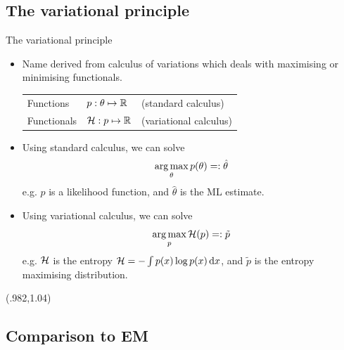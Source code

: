 \subsection{The variational principle}

\begin{frame}[label=variationalprinc]{The variational principle}
  \vspace{-10pt}
  \begin{itemize}[<+->]
    \item Name derived from calculus of variations which deals with maximising or minimising functionals.
    \begin{table}
      \begin{tabular}{l  l  l }
      Functions   &$p:\theta \mapsto \mathbb{R}$  &(standard calculus) \\ 
      Functionals &${\mathcal H}:p \mapsto \mathbb{R}$     &(variational calculus) \\ 
      \end{tabular}
    \end{table}
  \item Using standard calculus, we can solve
  \[
    \operatorname*{arg\,max}_\theta p(\theta) =: \hat\theta
  \]
  e.g. $p$ is a likelihood function, and $\hat\theta$ is the ML estimate.
  \item Using variational calculus, we can solve
  \[
    \operatorname*{arg\,max}_p {\mathcal H}(p) =: \tilde p
  \]
  e.g. ${\mathcal H}$ is the entropy ${\mathcal H} = - \int p(x)\log p(x) \, \text{d} x$, and $\tilde p$ is the entropy maximising distribution.
  \end{itemize}
  \vspace{5pt}
  
  \begin{textblock*}{3cm}(.982\textwidth,1.04\textheight)%
    \hyperlink{idea}{}      
  \end{textblock*}
\end{frame}

\subsection{Comparison to EM}

